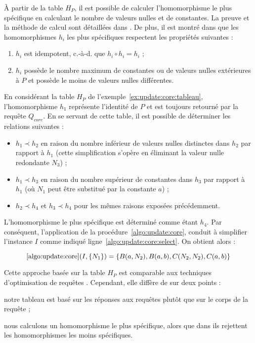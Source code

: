 À partir de la table $H_P$, il est possible de calculer l'homomorphisme le plus spécifique en calculant le nombre de valeurs nulles et de constantes.
La preuve et la méthode de calcul sont détaillées dans \cite{chabinIncrementalConsistentUpdating2023}.
De plus, il est montré dans \cite{chabinIncrementalConsistentUpdating2023} que les homomorphismes $h_i$ les plus spécifiques respectent les propriétés suivantes :

\begin{enumerate}
	\item $h_i$ est idempotent, c.-à-d. que $h_i \circ h_i = h_i$ ;
	\item $h_i$ possède le nombre maximum de constantes ou de valeurs nulles extérieures à $P$ et possède le moins de valeurs nulles différentes.
\end{enumerate}

\begin{example}
	En considérant la table $H_P$ de l'exemple~\ref{ex:update:core:tableau}, l'homomorphisme $h_1$ représente l'identité de $P$ et est toujours retourné par la requête $Q_{core}$.
	En se servant de cette table, il est possible de déterminer les relations suivantes :

	\begin{itemize}
		\item $h_1 \prec h_2$ en raison du nombre inférieur de valeurs nulles distinctes dans $h_2$ par rapport à $h_1$ (cette simplification s'opère en éliminant la valeur nulle redondante $N_3$) ;
		\item $h_1 \prec h_3$ en raison du nombre supérieur de constantes dans $h_3$ par rapport à $h_1$ (où $N_1$ peut être substitué par la constante $a$) ;
		\item $h_2 \prec h_4$ et $h_3 \prec h_4$ pour les mêmes raisons exposées précédemment.
	\end{itemize}

	L'homomorphisme le plus spécifique est déterminé comme étant $h_4$.
	Par conséquent, l'application de la procédure~\ref{algo:update:core}, conduit à simplifier l'instance $I$ comme indiqué ligne~\ref{algo:update:core:select}. On obtient alors :

	\[
		\ref{algo:update:core}(I, \{N_1\}) = \{B(a, N_2), B(a, b), C(N_2, N_2), C(a, b)\}
	\]
\end{example}

Cette approche basée sur la table $H_P $ est comparable aux techniques d'optimisation de requêtes \cite{chandraOptimalImplementationConjunctive1977}.
Cependant, elle diffère de \cite{ahoEfficientOptimizationClass1979,chandraOptimalImplementationConjunctive1977} sur deux points :
\begin{enumerate*}[label=(\roman*)]
	\item notre tableau est basé sur les réponses aux requêtes plutôt que sur le corps de la requête ;
	\item nous calculons un homomorphisme le plus spécifique, alors que dans \cite{ahoEfficientOptimizationClass1979} ils rejettent les homomorphismes les moins spécifiques.
\end{enumerate*}
